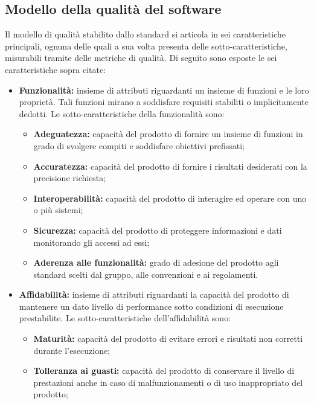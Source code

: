 \subsection{Modello della qualità del software} \label{subsection:modello_qualitaSW}
Il modello di qualità stabilito dallo standard si articola in sei caratteristiche principali, ognuna delle quali a sua volta presenta delle sotto-caratteristiche, misurabili tramite delle metriche di qualità.
Di seguito sono esposte le sei caratteristiche sopra citate:
\begin{itemize}
    \item \textbf{Funzionalità:} insieme di attributi riguardanti un insieme di funzioni e le loro proprietà.
          Tali funzioni mirano a soddisfare requisiti stabiliti o implicitamente dedotti.
          Le sotto-caratteristiche della funzionalità sono:
          \begin{itemize}
              \item \textbf{Adeguatezza:} capacità del prodotto di fornire un insieme di funzioni in grado di svolgere compiti e soddisfare obiettivi prefissati;
              \item \textbf{Accuratezza:} capacità del prodotto di fornire i risultati desiderati con la precisione richiesta;
              \item \textbf{Interoperabilità:} capacità del prodotto di interagire ed operare con uno o più sistemi;
              \item \textbf{Sicurezza:} capacità del prodotto di proteggere informazioni e dati monitorando gli accessi ad essi;
              \item \textbf{Aderenza alle funzionalità:} grado di adesione del prodotto agli standard scelti dal gruppo, alle convenzioni e ai regolamenti.
          \end{itemize}
    \item \textbf{Affidabilità:} insieme di attributi riguardanti la capacità del prodotto di mantenere un dato livello di performance sotto condizioni di esecuzione prestabilite.
          Le sotto-caratteristiche dell'affidabilità sono:
          \begin{itemize}
              \item \textbf{Maturità:} capacità del prodotto di evitare errori e risultati non corretti durante l'esecuzione;
              \item \textbf{Tolleranza ai guasti:} capacità del prodotto di conservare il livello di prestazioni anche in caso di malfunzionamenti o di uso inappropriato del prodotto;

\end{itemize}
\end{itemize}
